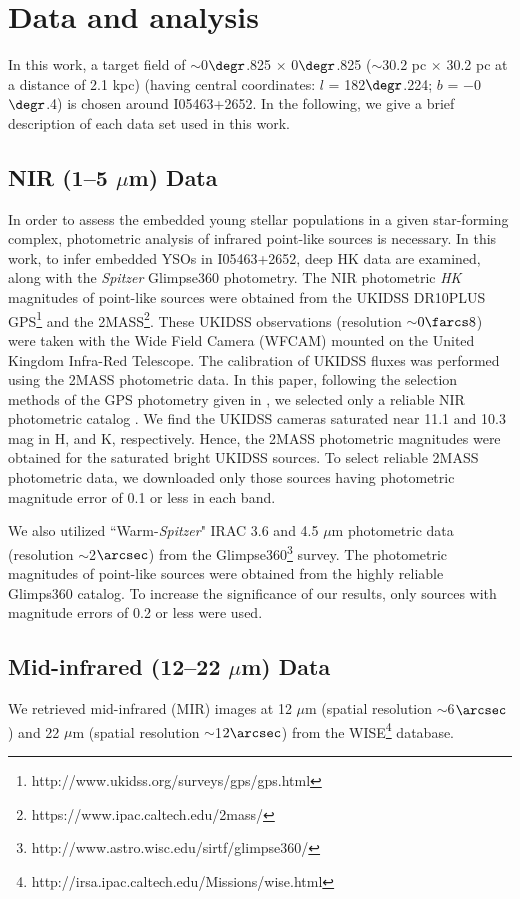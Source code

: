 \documentclass[iop]{emulateapj}
\begin{document}
\section{Data and analysis}
\label{sec:obser}
%
In this work, a target field of $\sim$0$\degr$.825 $\times$ 0$\degr$.825 ($\sim$30.2 pc $\times$ 30.2 pc at a distance of 2.1 kpc) 
(having central coordinates: $l$ = 182$\degr$.224; $b$ = $-$0$\degr$.4) is chosen around I05463+2652. 
In the following, we give a brief description of each data set used in this work. 
%
\subsection{NIR (1--5 $\mu$m) Data}
%
In order to assess the embedded young stellar populations in a given star-forming complex, photometric analysis of infrared point-like sources is necessary. 
In this work, to infer embedded YSOs in I05463+2652, deep HK data are examined, along with the {\it Spitzer} Glimpse360 photometry. 
The NIR photometric {\it HK} magnitudes of point-like sources were obtained from the UKIDSS DR10PLUS 
GPS\footnote[1]{http://www.ukidss.org/surveys/gps/gps.html} and the 2MASS\footnote[2]{https://www.ipac.caltech.edu/2mass/}. 
These UKIDSS observations (resolution $\sim$$0\farcs8$) were taken with the Wide Field Camera (WFCAM) mounted 
on the United Kingdom Infra-Red Telescope. The calibration of UKIDSS fluxes was performed using the 2MASS photometric data. 
In this paper, following the selection methods of the GPS photometry 
given in \citet{dewangan15}, we selected only a reliable NIR photometric catalog \citep[see][for more details]{dewangan15}. 
We find the UKIDSS cameras saturated near 11.1 and 10.3 mag in H, and K, respectively.
Hence, the 2MASS photometric magnitudes were obtained for the saturated bright UKIDSS sources. 
To select reliable 2MASS photometric data, we downloaded only those sources having photometric magnitude error of 0.1 or less in each band.

We also utilized ``Warm-{\it Spitzer}" IRAC 3.6 and 4.5 $\mu$m photometric data (resolution $\sim$2$\arcsec$) 
from the Glimpse360\footnote[3]{http://www.astro.wisc.edu/sirtf/glimpse360/} survey. 
The photometric magnitudes of point-like sources were obtained from the highly reliable Glimps360 catalog. 
To increase the significance of our results, only sources with magnitude errors of 0.2 or less were used.
%
\subsection{Mid-infrared (12--22 $\mu$m) Data}
%
We retrieved mid-infrared (MIR) images at 12 $\mu$m (spatial resolution $\sim$6$\arcsec$) and 22 $\mu$m (spatial resolution $\sim$1$2\arcsec$) 
from the WISE\footnote[4]{http://irsa.ipac.caltech.edu/Missions/wise.html} database.
%
\end{document}
